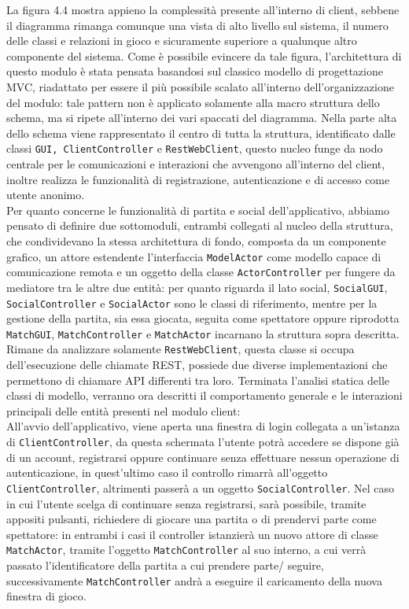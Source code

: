 La figura 4.4 mostra appieno la complessità presente all'interno di client, sebbene il diagramma rimanga comunque una vista di alto livello sul sistema, il numero delle classi e relazioni in gioco e sicuramente superiore a qualunque altro componente del sistema.
Come è possibile evincere da tale figura, l'architettura di questo modulo è stata pensata basandosi sul classico modello di progettazione MVC, riadattato per essere il più possibile scalato all'interno dell'organizzazione del modulo: tale pattern non è applicato solamente alla macro struttura dello schema, ma si ripete all'interno dei vari spaccati del diagramma.
Nella parte alta dello schema viene rappresentato il centro di tutta la struttura, identificato dalle classi \texttt{GUI, ClientController} e \texttt{RestWebClient}, questo nucleo funge da nodo centrale per le comunicazioni e interazioni che avvengono all'interno del client, inoltre realizza le funzionalità di registrazione, autenticazione e di accesso come utente anonimo.\\
Per quanto concerne le funzionalità di partita e social dell'applicativo, abbiamo pensato di definire due sottomoduli, entrambi collegati al nucleo della struttura, che condividevano la stessa architettura di fondo, composta da un componente grafico, un attore estendente l'interfaccia \texttt{ModelActor} come modello capace di comunicazione remota e un oggetto della classe \texttt{ActorController} per fungere da mediatore tra le altre due entità: per quanto riguarda il lato social, \texttt{SocialGUI}, \texttt{SocialController} e \texttt{SocialActor} sono le classi di riferimento, mentre per la gestione della partita, sia essa giocata, seguita come spettatore oppure riprodotta \texttt{MatchGUI}, \texttt{MatchController} e \texttt{MatchActor} incarnano la struttura sopra descritta.\\
Rimane da analizzare solamente \texttt{RestWebClient}, questa classe si occupa dell'esecuzione delle chiamate REST, possiede due diverse implementazioni che permettono di chiamare API differenti tra loro.
Terminata l'analisi statica delle classi di modello, verranno ora descritti il comportamento generale e le interazioni principali delle entità presenti nel modulo client:\\ 
All'avvio dell'applicativo, viene aperta una finestra di login collegata a un'istanza di \texttt{ClientController}, da questa schermata l'utente potrà accedere se dispone già di un account, registrarsi oppure continuare senza effettuare nessun operazione di autenticazione, in quest'ultimo caso il controllo rimarrà all'oggetto \texttt{ClientController}, altrimenti passerà a un oggetto \texttt{SocialController}. Nel caso in cui l'utente scelga di continuare senza registrarsi, sarà possibile, tramite appositi pulsanti, richiedere di giocare una partita o di prendervi parte come spettatore: in entrambi i casi il controller istanzierà un nuovo attore di classe \texttt{MatchActor}, tramite l'oggetto \texttt{MatchController} al suo interno, a cui verrà passato l'identificatore della partita a cui prendere parte/ seguire, successivamente \texttt{MatchController} andrà a eseguire il caricamento della nuova finestra di gioco.
